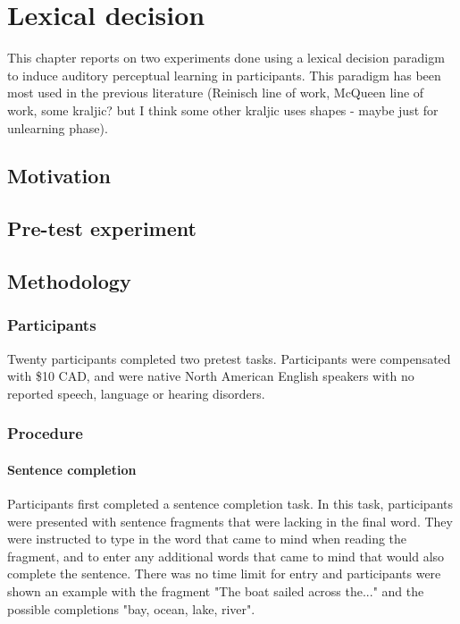 
\chapter{Lexical decision}

This chapter reports on two experiments done using a lexical decision paradigm to induce auditory perceptual learning in participants.  This paradigm has been most used in the previous literature (Reinisch line of work, McQueen line of work, some kraljic? but I think some other kraljic uses shapes - maybe just for unlearning phase).

\section{Motivation}



\section{Pre-test experiment}

\section{Methodology}

\subsection{Participants}

Twenty participants completed two pretest tasks. Participants were compensated with \$10 CAD, and were native North American English speakers with no reported speech, language or hearing disorders.

\subsection{Procedure}

\subsubsection{Sentence completion}

Participants first completed a sentence completion task.  In this task, participants were presented with sentence fragments that were lacking in the final word.  They were instructed to type in the word that came to mind when reading the fragment, and to enter any additional words that came to mind that would also complete the sentence.  There was no time limit for entry and participants were shown an example with the fragment "The boat sailed across the..." and the possible completions "bay, ocean, lake, river".

